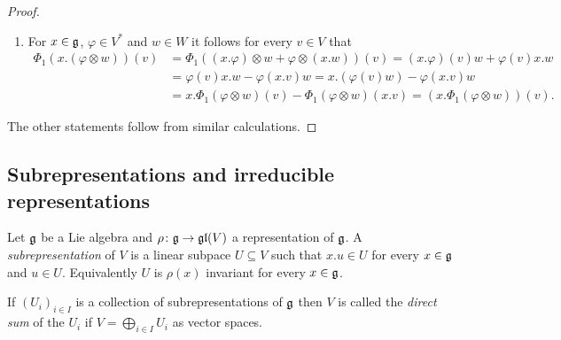 \begin{proof}
 \begin{enumerate}[leftmargin=*]
  \item
   For $x \in \mathfrak{g}$, $\varphi \in V^*$ and $w \in W$ it follows for every $v \in V$ that
   \begin{align*}
    \Phi_1(x.(\varphi \otimes w))(v)
    &= \Phi_1((x.\varphi) \otimes w + \varphi \otimes (x.w))(v)
    = (x.\varphi)(v) w + \varphi(v) x.w \\
    &= \varphi(v) x.w -\varphi(x.v) w
    = x.(\varphi(v) w) - \varphi(x.v) w \\
    &= x.\Phi_1(\varphi \otimes w)(v) - \Phi_1(\varphi \otimes w)(x.v)
    = (x.\Phi_1(\varphi \otimes w))(v).
   \end{align*}
 \end{enumerate}
 The other statements follow from similar calculations.
\end{proof}







\subsection{Subrepresentations and irreducible representations}


\begin{definition}
 Let $\mathfrak{g}$ be a Lie algebra and $\rho \colon \mathfrak{g} \to \mathfrak{gl}(V)$ a representation of $\mathfrak{g}$. A \emph{subrepresentation} of $V$ is a linear subpace $U \subseteq V$ such that $x.u \in U$ for every $x \in \mathfrak{g}$ and $u \in U$. Equivalently $U$ is $\rho(x)$ invariant for every $x \in \mathfrak{g}$.
 
 If $(U_i)_{i \in I}$ is a collection of subrepresentations of $\mathfrak{g}$ then $V$ is called the \emph{direct sum} of the $U_i$ if $V = \bigoplus_{i \in I} U_i$ as vector spaces.
\end{definition}


